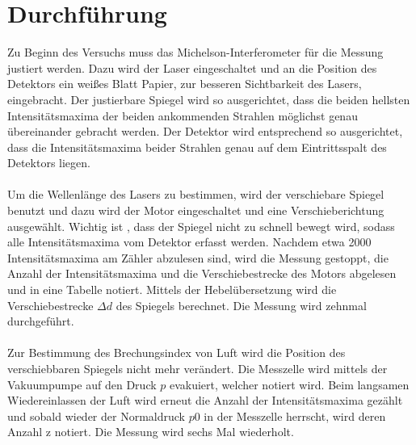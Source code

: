 \section{Durchführung}
\label{Durchführung}
Zu Beginn des Versuchs muss das Michelson-Interferometer für die Messung justiert werden. 
Dazu wird der Laser eingeschaltet und an die Position des Detektors ein weißes Blatt Papier, zur besseren Sichtbarkeit des Lasers, eingebracht.
Der justierbare Spiegel wird so ausgerichtet, dass die beiden hellsten Intensitätsmaxima
der beiden ankommenden Strahlen möglichst genau übereinander gebracht werden. 
Der Detektor wird entsprechend so ausgerichtet, dass die Intensitätsmaxima beider
Strahlen genau auf dem Eintrittsspalt des Detektors liegen.\\
\\
Um die Wellenlänge des Lasers zu bestimmen, wird der verschiebare Spiegel benutzt und dazu wird der Motor eingeschaltet und eine Verschieberichtung
ausgewählt.
Wichtig ist , dass der Spiegel nicht zu schnell bewegt wird, sodass alle Intensitätsmaxima vom Detektor erfasst werden.
Nachdem etwa 2000 Intensitätsmaxima am Zähler abzulesen sind, wird die Messung gestoppt, die Anzahl der Intensitätsmaxima und die Verschiebestrecke 
des Motors abgelesen und in eine Tabelle notiert.
Mittels der Hebelübersetzung wird die Verschiebestrecke $\Delta d$ des Spiegels berechnet.
Die Messung wird zehnmal durchgeführt.\\
\\

Zur Bestimmung des Brechungsindex von Luft wird die Position des verschiebbaren Spiegels nicht
mehr verändert.
Die Messzelle wird mittels der Vakuumpumpe auf den Druck $p$ evakuiert, welcher notiert
wird. Beim langsamen Wiedereinlassen der Luft wird erneut die Anzahl der Intensitätsmaxima gezählt
und sobald wieder der Normaldruck $p0$ in der Messzelle herrscht, wird deren Anzahl z notiert.
Die Messung wird sechs Mal wiederholt.
